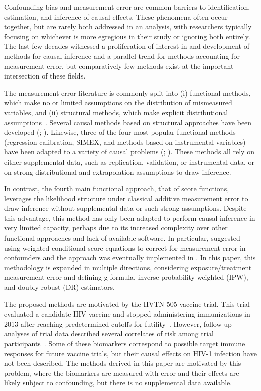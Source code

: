 \documentclass[useAMS,usenatbib,referee]{biom}
\begin{document}
Confounding bias and measurement error are common barriers to identification, estimation, and inference of causal effects. These phenomena often occur together, but are rarely both addressed in an analysis, with researchers typically focusing on whichever is more egregious in their study or ignoring both entirely. The last few decades witnessed a proliferation of interest in and development of methods for causal inference and a parallel trend for methods accounting for measurement error, but comparatively few methods exist at the important intersection of these fields.

The measurement error literature is commonly split into (i) functional methods, which make no or limited assumptions on the distribution of mismeasured variables, and (ii) structural methods, which make explicit distributional assumptions~\citep{carroll2006}. Several causal methods based on structural approaches have been developed (\citealp{kuroki2014,edwards2015multiple,braun2017}; \citealp*{hong2017}). Likewise, three of the four most popular functional methods (regression calibration, SIMEX, and methods based on instrumental variables) have been adapted to a variety of causal problems (\citealp*{vansteelandt2009}; \citealp{cole2010,kendall2015,lockwood2015,kyle2016,wu2019}). These methods all rely on either supplemental data, such as replication, validation, or instrumental data, or on strong distributional and extrapolation assumptions to draw inference.

In contrast, the fourth main functional approach, that of score functions, leverages the likelihood structure under classical additive measurement error to draw inference without supplemental data or such strong assumptions. Despite this advantage, this method has only been adapted to perform causal inference in very limited capacity, perhaps due to its increased complexity over other functional approaches and lack of available software. In particular, \citet*{mccaffrey2013} suggested using weighted conditional score equations to correct for measurement error in confounders and the approach was eventually implemented in \citet{shu2019}. In this paper, this methodology is expanded in multiple directions, considering exposure/treatment measurement error and defining g-formula, inverse probability weighted (IPW), and doubly-robust (DR) estimators.

The proposed methods are motivated by the HVTN 505 vaccine trial. This trial evaluated a candidate HIV vaccine and stopped administering immunizations in 2013 after reaching predetermined cutoffs for futility~\citep{hammer2013}. However, follow-up analyses of trial data described several correlates of risk among trial participants~\citep{decamp2017,janes2017,fong2018,neidich2019}. Some of these biomarkers correspond to possible target immune responses for future vaccine trials, but their causal effects on HIV-1 infection have not been described. The methods derived in this paper are motivated by this problem, where the biomarkers are measured with error and their effects are likely subject to confounding, but there is no supplemental data available.
\end{document}
